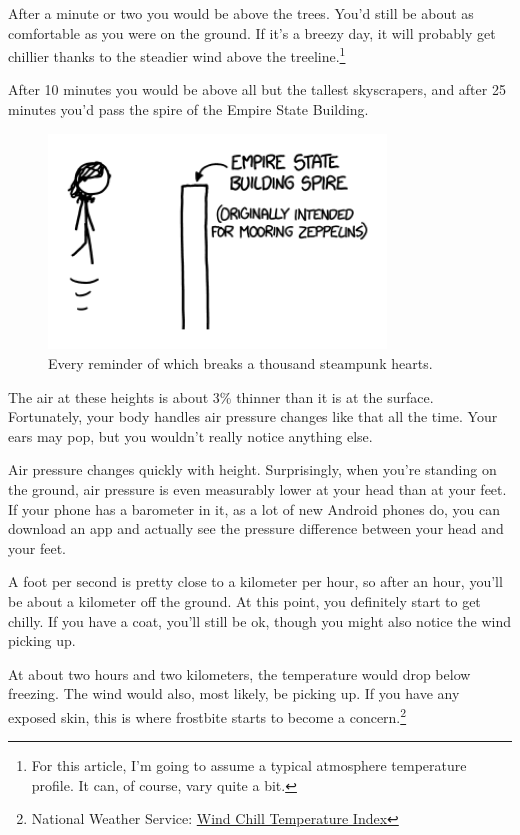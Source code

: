 {{After a minute or two you would be above the trees. You'd still be about as comfortable as you were on the ground. If it's a breezy day, it will probably get chillier thanks to the steadier wind above the treeline.{\footnote{For this article, I'm going to assume a typical atmosphere temperature profile. It can, of course, vary quite a bit.} } }

{After 10 minutes you would be above all but the tallest skyscrapers, and after 25 minutes you'd pass the spire of the Empire State Building.}

\begin{figure}[!htbp]
\centering
\includegraphics[scale=0.5, max width=0.8\textwidth]{imgs/a/64/rising_spire.png}
\caption{Every reminder of which breaks a thousand steampunk hearts.}
\end{figure}

{The air at these heights is about 3\% thinner than it is at the surface. Fortunately, your body handles air pressure changes like that all the time. Your ears may pop, but you wouldn't really notice anything else.}

{Air pressure changes quickly with height. Surprisingly, when you're standing on the ground, air pressure is even measurably lower at your head than at your feet. If your phone has a barometer in it, as a lot of new Android phones do, you can download an app and actually see the pressure difference between your head and your feet.}

{A foot per second is pretty close to a kilometer per hour, so after an hour, you'll be about a kilometer off the ground. At this point, you definitely start to get chilly. If you have a coat, you'll still be ok, though you might also notice the wind picking up.}

{At about two hours and two kilometers, the temperature would drop below freezing. The wind would also, most likely, be picking up. If you have any exposed skin, this is where frostbite starts to become a concern.{\footnote{National Weather Service: \href{http://www.nws.noaa.gov/om/windchill/images/wind-chill-brochure.pdf}{Wind Chill Temperature Index}} } }

}
